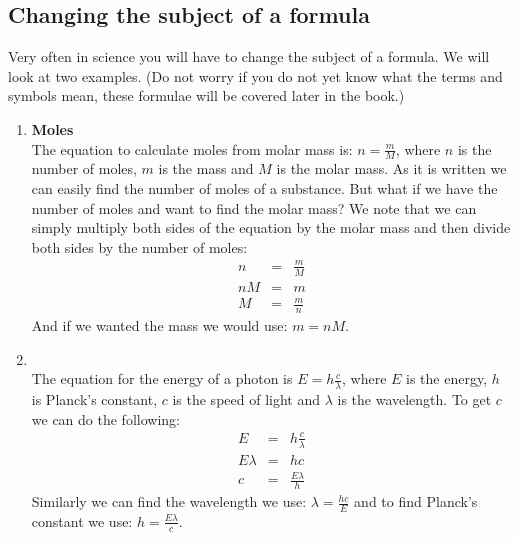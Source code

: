 \begin{enumerate}[label=\textbf{\arabic*}.]
\subsection*{Changing the subject of a formula}
Very often in science you will have to change the subject of a formula. We will look at two examples. (Do not worry if you do not yet know what the terms and symbols mean, these formulae will be covered later in the book.)
\begin{enumerate}[label=\textbf{\arabic*}.]
 \item \textbf{Moles}\\
The equation to calculate moles from molar mass is: $n = \frac{m}{M}$, where $n$ is the number of moles, $m$ is the mass and $M$ is the molar mass. As it is written we can easily find the number of moles of a substance. But what if we have the number of moles and want to find the molar mass? We note that we can simply multiply both sides of the equation by the molar mass and then divide both sides by the number of moles:
\begin{eqnarray*}
 n & = & \frac{m}{M} \\
nM & = & m \\
M & = & \frac{m}{n}
\end{eqnarray*}
And if we wanted the mass we would use: $m = nM$.
\item {}\\
The equation for the energy of a photon is $E = h\frac{c}{\lambda}$, where $E$ is the energy, $h$ is Planck's constant, $c$ is the speed of light and $\lambda$ is the wavelength. To get $c$ we can do the following:
\begin{eqnarray*}
 E & = & h\frac{c}{\lambda} \\
E \lambda & = & hc \\
c & = & \frac{E \lambda}{h}
\end{eqnarray*}  
Similarly we can find the wavelength we use: $\lambda = \frac{hc}{E}$ and to find Planck's constant we use: $h =  \frac{E \lambda}{c}$.
\end{enumerate}

\end{enumerate}
